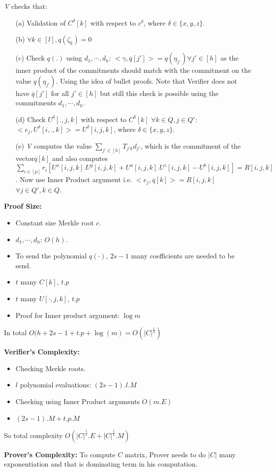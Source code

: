 \documentclass[runningheads]{llncs}
\begin{document}
\textit{V} checks that:
\begin{itemize}
	\item[(a)] Validation of $C^{\delta}[k]$ with respect to $c^{\delta}$, where $\delta\in\{x,y,z\}$. 
	\item[(b)] $\forall k\in[l], q(\zeta_k)=0$
	\item[(c)] Check $q(.)$ using $d_1,\cdots,d_h$: $<\gamma,\overline{q}[j']>=q(\eta_{j'})\forall j'\in[h]$ as the inner product of the commitments should match with the commitment on the value $q(\eta_{j'})$. Using the idea of bullet proofs. Note that Verifier does not have $\overline{q}[j'] $ for all $j'\in[h]$ but still this check is possible using the commitments $d_1,\cdots, d_h$.
	\item[(d)] Check $U^{\delta}[.,j,k]$ with respect to $C^{\delta}[k]$ $\forall k\in Q,  j\in Q'$: $<e_j,U^{\delta}[i,.,k]>=U^{\delta}[i,j,k]$, where $\delta\in\{x,y,z\}$. 
	\item[(e)] \textit{V} computes the value $\sum\limits_{j'\in[h]}T_{j'k}d_{j'}$, which is the commitment of the vector$\overline{q}[k]$ and also computes$\sum\limits_{i\in[p]} r_i[U^{x}[i,j,k].U^y[i,j,k]+U^{a}[i,j,k].U^z[i,j,k]-U^{b}[i,j,k]] =R[i,j,k]$. Now use Inner Product argument i.e. $<e_j,\overline{q}[k]>=R[i,j,k]$ $\forall j\in Q', k\in Q$.\\
\end{itemize}

\textbf{Proof Size:}
\begin{itemize}
	\item Constant size Merkle root $c$.
	\item $d_1,\cdots, d_h$: $O(h)$.
	\item To send the polynomial $q(\cdot)$, $2s-1$ many coefficients are needed to be send.
	\item $t$ many $C[k]$, $t.p$
	\item $t$ many $U[\cdot,j,k]$, $t.p$
	\item Proof for Inner product argument: $\log m$
\end{itemize}
In total $O(h+2s-1+t.p+\log(m) = O(|C|^{\frac{1}{4}})$

\textbf{Verifier's Complexity:}
\begin{itemize}
	\item Checking Merkle roots.
	\item $l$ polynomial evaluations: $(2s-1).l.M$
	\item Checking using Inner Product arguments $O(m.E)$
	\item $(2s-1).M+t.p.M$
\end{itemize}
So total complexity $O(|C|^{\frac{1}{2}}. E + |C|^{\frac{1}{2}}. M)$

\textbf{Prover's Complexity:}
 To compute $C$ matrix, Prover needs to do $|C|$ many exponentiation and that is dominating term in his computation.

	
\end{document}
